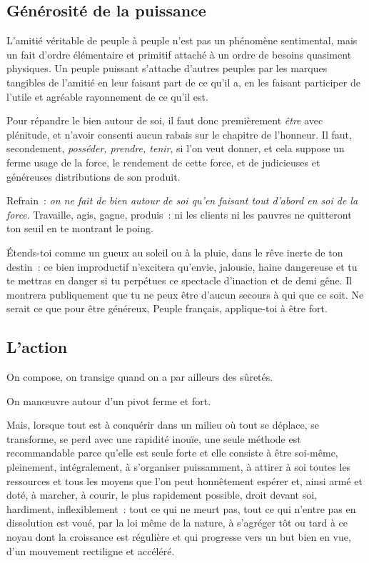 \documentclass[french,twoside]{book} %
\newcommand{\astermono}{\medskip\centerline{\color{rubric}\large\selectfont{\syms ✻}}\medskip\par}%
\begin{document}
\subsection[{Générosité de la puissance}]{Générosité de la puissance}
\noindent L’amitié véritable de peuple à peuple n’est pas un phénomène sentimental, mais un fait d’ordre élémentaire et primitif attaché à un ordre de besoins quasiment physiques. Un peuple puissant s’attache d’autres peuples par les marques tangibles de l’amitié en leur faisant part de ce qu’il a, en les faisant participer de l’utile et agréable rayonnement de ce qu’il est.\par
Pour répandre le bien autour de soi, il faut donc premièrement \emph{être} avec plénitude, et n’avoir consenti aucun rabais sur le chapitre de l’honneur. Il faut, secondement, \emph{posséder, prendre, tenir}, si l’on veut donner, et cela suppose un ferme usage de la force, le rendement de cette force, et de judicieuses et généreuses distributions de son produit.\par
Refrain : \emph{on ne fait de bien autour de soi qu’en faisant tout d’abord en soi de la force}. Travaille, agis, gagne, produis : ni les clients ni les pauvres ne quitteront ton seuil en te montrant le poing.\par
Étends-toi comme un gueux au soleil ou à la pluie, dans le rêve inerte de ton destin : ce bien improductif n’excitera qu’envie, jalousie, haine dangereuse et tu te mettras en danger si tu perpétues ce spectacle d’inaction et de demi gêne. Il montrera publiquement que tu ne peux être d’aucun secours à qui que ce soit. Ne serait ce que pour être généreux, Peuple français, applique-toi à être fort.\par

\astermono

\subsection[{L’action}]{L’action}
\noindent On compose, on transige quand on a par ailleurs des sûretés.\par
On manœuvre autour d’un pivot ferme et fort.\par
Mais, lorsque tout est à conquérir dans un milieu où tout se déplace, se transforme, se perd avec une rapidité inouïe, une seule méthode est recommandable parce qu’elle est seule forte et elle consiste à être soi-même, pleinement, intégralement, à s’organiser puissamment, à attirer à soi toutes les ressources et tous les moyens que l’on peut honnêtement espérer et, ainsi armé et doté, à marcher, à courir, le plus rapidement possible, droit devant soi, hardiment, inflexiblement : tout ce qui ne meurt pas, tout ce qui n’entre pas en dissolution est voué, par la loi même de la nature, à s’agréger tôt ou tard à ce noyau dont la croissance est régulière et qui progresse vers un but bien en vue, d’un mouvement rectiligne et accéléré.
\end{document}
